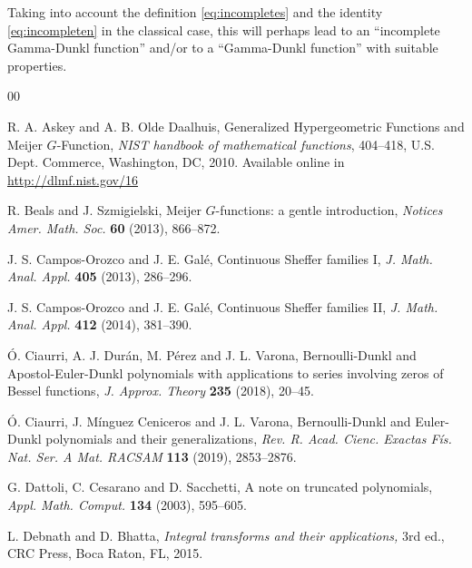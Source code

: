 \documentclass[11pt,a4paper]{amsart}
\theoremstyle{plain}
\theoremstyle{plain}
\theoremstyle{remark}
\numberwithin{equation}{section}
\begin{document}
Taking into account the definition \eqref{eq:incompletes} and the identity \eqref{eq:incompleten} in the classical case, this will perhaps lead to an ``incomplete Gamma-Dunkl function'' and/or to a ``Gamma-Dunkl function'' with suitable properties.

\begin{thebibliography}{00}

R. A. Askey and A. B. Olde Daalhuis,
Generalized Hypergeometric Functions and Meijer $G$-Function,
\textit{NIST handbook of mathematical functions},
404--418, %
U.S. Dept. Commerce, Washington, DC, 2010.
Available online in \url{http://dlmf.nist.gov/16}

R. Beals and J. Szmigielski, 
Meijer $G$-functions: a gentle introduction,
\textit{Notices Amer. Math. Soc.} 
\textbf{60} (2013), 866--872. %

J. S. Campos-Orozco and J. E. Gal\'e,
Continuous Sheffer families I,
\textit{J. Math. Anal. Appl.} 
\textbf{405} (2013), 286--296.

J. S. Campos-Orozco and J. E. Gal\'e,
Continuous Sheffer families II,
\textit{J. Math. Anal. Appl.} 
\textbf{412} (2014), 381--390.

\'O. Ciaurri, A. J. Dur\'an, M. P\'erez and J. L. Varona,
{Bernoulli-Dunkl and Apostol-Euler-Dunkl polynomials with applications to series involving zeros of Bessel functions},
\textit{J. Approx. Theory}
\textbf{235} (2018), 20--45.

\'O. Ciaurri, J. M\'inguez Ceniceros and J. L. Varona,
{Bernoulli-Dunkl and Euler-Dunkl polynomials and their generalizations},
\textit{Rev. R. Acad. Cienc. Exactas F\'is. Nat. Ser. A Mat. RACSAM}
\textbf{113} (2019), 2853--2876.

G. Dattoli, C. Cesarano and D. Sacchetti,
A note on truncated polynomials,
\textit{Appl. Math. Comput.}
\textbf{134} (2003), 595--605.

L. Debnath and D. Bhatta,
\textit{Integral transforms and their applications,}
3rd ed., CRC Press, Boca Raton, FL, 2015.


\end{thebibliography}
\end{document}
